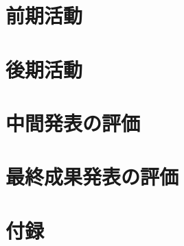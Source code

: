 \documentclass[11pt,a4paper,oneside]{jsbook}
\begin{document}
\chapter{前期活動}

%
\chapter{後期活動}

\chapter{中間発表の評価}

\chapter{最終成果発表の評価}




\chapter{付録}



%
%
%
\end{document}
